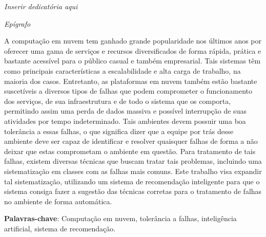 \documentclass[
	12pt,				%
	openright,			%
	twoside,			%
	a4paper,			%
	english,			%
	french,				%
	spanish,			%
	brazil				%
	]{abntex2}
\begin{document}
\begin{dedicatoria}
   \vspace*{\fill}
   \centering
   \noindent
   \textit{ Inserir dedicatória aqui} \vspace*{\fill}
\end{dedicatoria}

\begin{agradecimentos}


\end{agradecimentos}

\begin{epigrafe}
    \vspace*{\fill}
	\begin{flushright}
		\textit{Epígrafo}
	\end{flushright}
\end{epigrafe}


\setlength{\absparsep}{18pt} %
\begin{resumo}
 A computação em nuvem tem ganhado grande popularidade nos últimos anos por oferecer uma gama de serviços e recursos diversificados de forma rápida, prática e bastante acessível para o público casual e também empresarial. Tais sistemas têm como principais características a escalabilidade e alta carga de trabalho, na maioria dos casos. Entretanto, as plataformas em nuvem também estão bastante suscetíveis a diversos tipos de falhas que podem comprometer o funcionamento dos serviços, de sua infraestrutura e de todo o sistema que os comporta, permitindo assim uma perda de dados massiva e possível interrupção de suas atividades por tempo indeterminado. Tais ambientes devem possuir uma boa tolerância a essas falhas, o que significa dizer que a equipe por trás desse ambiente deve ser capaz de identificar e resolver quaisquer falhas de forma a não deixar que estas comprometam o ambiente em questão. Para tratamento de tais falhas, existem diversas técnicas que buscam tratar tais problemas, incluindo uma sistematização em classes com as falhas mais comuns.
 Este trabalho visa expandir tal sistematização, utilizando um sistema de recomendação inteligente para que o sistema consiga fazer a sugestão das técnicas corretas para o tratamento de falhas no ambiente de forma automática.

 \textbf{Palavras-chave}: Computação em nuvem, tolerância a falhas, inteligência artificial, sistema de recomendação.
\end{resumo}
\end{document}
